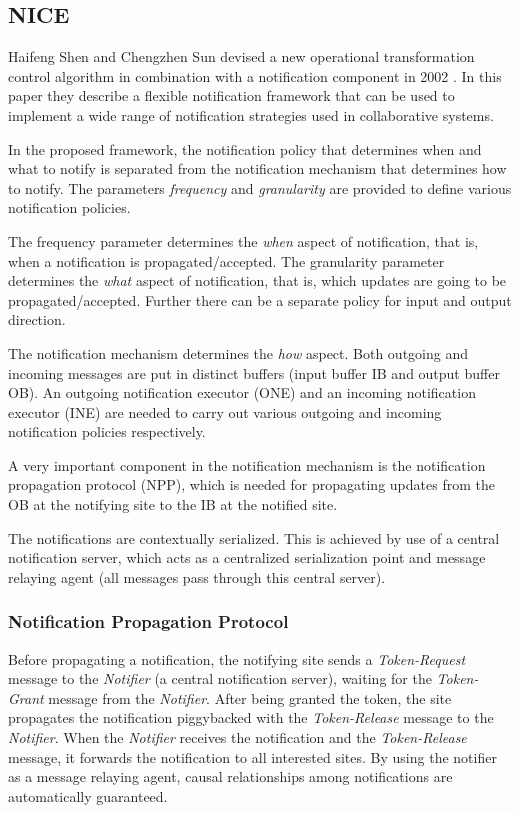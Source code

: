 \subsection{NICE}
\label{algo:nice}

Haifeng Shen and Chengzhen Sun devised a new operational transformation control algorithm in combination with a notification component in 2002 \cite{sun02}. In this paper they describe a flexible notification framework that can be used to implement a wide range of notification strategies used in collaborative systems.

In the proposed framework, the notification policy that determines when and what to notify is separated from the notification mechanism that determines how to notify. The parameters \emph{frequency} and \emph{granularity} are provided to define various notification policies. 

The frequency parameter determines the \emph{when} aspect of notification, that is, when a notification is propagated/accepted. The granularity parameter determines the \emph{what} aspect of notification, that is, which updates are going to be propagated/accepted. Further there can be a separate policy for input and output direction.

The notification mechanism determines the \emph{how} aspect. Both outgoing and incoming messages are put in distinct buffers (input buffer IB and output buffer OB). An outgoing notification executor (ONE) and an incoming notification executor (INE) are needed to carry out various outgoing and incoming notification policies respectively.

A very important component in the notification mechanism is the notification propagation protocol (NPP), which is needed for propagating updates from the OB at the notifying site to the IB at the notified site.

The notifications are contextually serialized. This is achieved by use of a central notification server, which acts as a centralized serialization point and message relaying agent (all messages pass through this central server). 


\subsubsection{Notification Propagation Protocol}
Before propagating a notification, the notifying site sends a \emph{Token-Request} message to the \emph{Notifier} (a central notification server), waiting for the \emph{Token-Grant} message from the \emph{Notifier}. After being granted the token, the site propagates the notification piggybacked with the \emph{Token-Release} message to the \emph{Notifier}. When the \emph{Notifier} receives the notification and the \emph{Token-Release} message, it forwards the notification to all interested sites. By using the notifier as a message relaying agent, causal relationships among notifications are automatically guaranteed.

